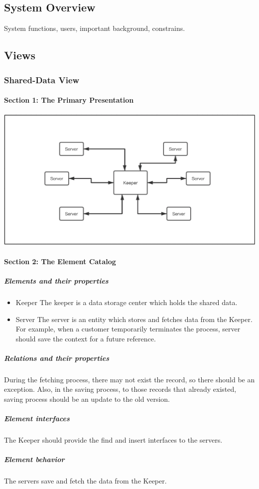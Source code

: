 \documentclass{article}
\begin{document}
	\subsection{System Overview}
	System functions, users, important background, constrains.
	
	\subsection{Views}

		\subsubsection{Shared-Data View} 
			\paragraph{Section 1: The Primary Presentation}
			\begin{center}
			\includegraphics[scale=0.3]{share.png}
			\end{center}
			\paragraph{Section 2: The Element Catalog}
			\subparagraph{Elements and their properties}
			\begin{itemize}
			\item{Keeper} The keeper is a data storage center which holds the shared data.
			\item{Server} The server is an entity which stores and fetches data from the Keeper. For example, when a customer temporarily terminates the process, server should save the context for a future reference.
			\end{itemize}
			\subparagraph{Relations and their properties}
			During the fetching process, there may not exist the record, so there should be an exception. Also, in the saving process, to those records that already existed, saving process should be an update to the old version.
			\subparagraph{Element interfaces}
			The Keeper should provide the find and insert interfaces to the servers.
			\subparagraph{Element behavior}
			The servers save and fetch the data from the Keeper.
\end{document}
